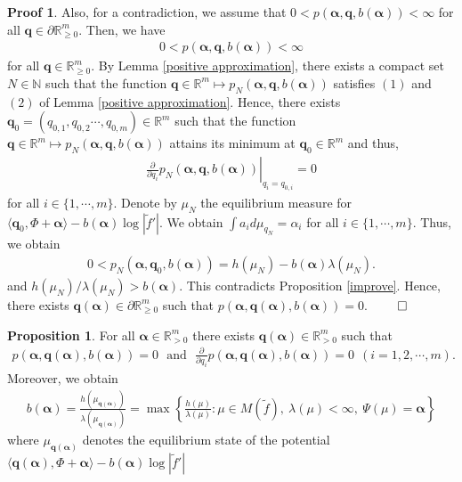 \documentclass{article}
\theoremstyle{definition}
\newtheorem{prop}[thm]{Proposition}
\newtheorem*{pf}{Proof}
\begin{document}
\begin{pf}
Also, for a contradiction, we assume that 
    $0<p(\boldsymbol{\alpha},\boldsymbol{q},b(\boldsymbol{\alpha}))<\infty$
for all $\boldsymbol{q}\in\partial\mathbb{R}_{\geq 0}^m$. Then, we have 
\begin{align*}
       0<p(\boldsymbol{\alpha},\boldsymbol{q},b(\boldsymbol{\alpha}))<\infty
       \end{align*}
for all $\boldsymbol{q}\in\mathbb{R}_{\geq 0}^m$.
By Lemma \ref{positive approximation}, there exists a compact set $N\in\mathbb{N}$ such that the function  $\boldsymbol{q}\in\mathbb{R}^m\mapsto p_N(\boldsymbol{\alpha},\boldsymbol{q},b(\boldsymbol{\alpha}))$ satisfies $(1)$ and $(2)$ of Lemma \ref{positive approximation}. Hence, there exists $\boldsymbol{q}_0=(q_{0,1},q_{0,2}\cdots,q_{0,m})\in\mathbb{R}^m$ such that the function  $\boldsymbol{q}\in\mathbb{R}^m\mapsto p_N(\boldsymbol{\alpha},\boldsymbol{q},b(\boldsymbol{\alpha}))$ attains its minimum at $\boldsymbol{q}_0\in\mathbb{R}^m$ and thus, 
\begin{align}
    \left. \frac{\partial}{\partial q_i}p_N(\boldsymbol{\alpha},\boldsymbol{q},b(\boldsymbol{\alpha}))\right|_{q_i=q_{0,i}}= 0\nonumber
\end{align}
for all $i\in\lbrace1,\cdots,m\rbrace$. Denote by $\mu_N$ the equilibrium measure for $\langle\boldsymbol{q}_0,\Phi+\boldsymbol{\alpha}\rangle-b(\boldsymbol{\alpha})\log|\tilde f '|$. We obtain 
 $\int a_i d \mu_{q_N} = \alpha_i$ for all $i\in\lbrace1,\cdots,m\rbrace$. Thus, we obtain 
\begin{align}\nonumber
0<p_N(\boldsymbol{\alpha},\boldsymbol{q}_0,b(\boldsymbol{\alpha}))=h(\mu_N)-b(\boldsymbol{\alpha})\lambda(\mu_N).\nonumber
\end{align}
and ${h(\mu_N)}/{\lambda(\mu_N)} > b(\boldsymbol{\alpha})$. This contradicts Proposition \ref{improve}. Hence, there exists $\boldsymbol{q}(\boldsymbol{\alpha})\in\partial\mathbb{R}_{\geq 0}^m$ such that $p(\boldsymbol{\alpha},\boldsymbol{q}(\boldsymbol{\alpha}),b(\boldsymbol{\alpha}))=0$.
$\qed$
\end{pf}
\begin{prop}\label{prop more important proposition}
    For all $\boldsymbol{\alpha}\in\mathbb{R}_{>0}^m$ there exists $\boldsymbol{q}(\boldsymbol{\alpha})\in\mathbb{R}_{>0}^m$ such that 
\begin{align}\nonumber
     p(\boldsymbol{\alpha},\boldsymbol{q}(\boldsymbol{\alpha}),b(\boldsymbol{\alpha}))=0\ \ \ 
        \text{and}\ \ \ 
\frac{\partial}{\partial q_i}p(\boldsymbol{\alpha},\boldsymbol{q}(\boldsymbol{\alpha}),b(\boldsymbol{\alpha}))=0\ \ (i=1,2,\cdots,m).
\end{align}
Moreover, we obtain 
\begin{align*}
    b(\boldsymbol{\alpha})=\frac{h(\mu_{\boldsymbol{q}(\boldsymbol{\alpha})})}{\lambda(\mu_{\boldsymbol{q}(\boldsymbol{\alpha})})}=\max\left\{\frac{h(\mu)}{\lambda(\mu)}:\mu\in M(\tilde f),\ \lambda(\mu)<\infty,\ \Psi(\mu)=\boldsymbol{\alpha}\right\}
    \end{align*}
where $\mu_{\boldsymbol{q}(\boldsymbol{\alpha})}$ denotes the equilibrium state of the potential $\langle\boldsymbol{q}(\boldsymbol{\alpha}),\Phi+\boldsymbol{\alpha}\rangle-b(\boldsymbol{\alpha})\log|\tilde f'|$
\end{prop}
\end{document}
